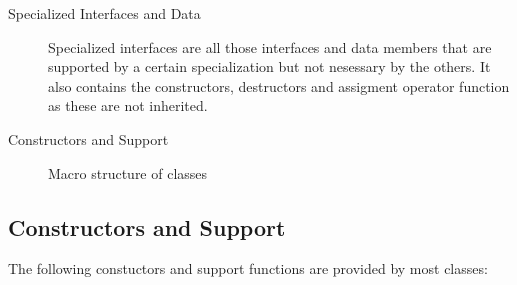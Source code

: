 \documentclass[12pt,a4paper]{book}
\begin{document}
\begin{description}
  \item [Specialized Interfaces and Data]
    Specialized interfaces are all those interfaces and data members that
    are supported by a certain specialization but not nesessary by the
    others. It also contains the constructors, destructors and assigment
    operator function as these are not inherited.
    
  \item [Constructors and Support]
    
\end{description}

\begin{figure}[htb]
    \caption{\small{Macro structure of classes}}
    \label{fig:classes.macro}
\end{figure}

\subsection{Constructors and Support}
The following constuctors and support functions are provided by most classes:
\end{document}
